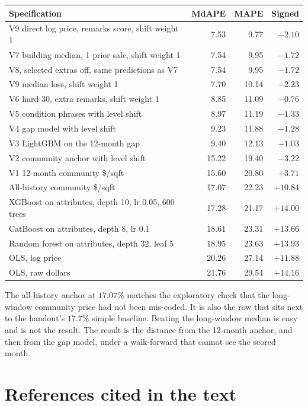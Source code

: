 \documentclass[11pt]{article}
\begin{document}
\begin{center}
\small
\begin{tabular}{p{9.2cm}rrr}
\toprule
Specification & MdAPE & MAPE & Signed \\
\midrule
V9 direct log price, remarks score, shift weight 1 & 7.53 & 9.77 & \(-2.10\) \\
V7 building median, 1 prior sale, shift weight 1 & 7.54 & 9.95 & \(-1.72\) \\
V8, selected extras off, same predictions as V7 & 7.54 & 9.95 & \(-1.72\) \\
V9 median loss, shift weight 1 & 7.70 & 10.14 & \(-2.23\) \\
V6 hard 30, extra remarks, shift weight 1 & 8.85 & 11.09 & \(-0.76\) \\
V5 condition phrases with level shift & 8.97 & 11.19 & \(-1.33\) \\
V4 gap model with level shift & 9.23 & 11.88 & \(-1.28\) \\
V3 LightGBM on the 12-month gap & 9.40 & 12.13 & \(+1.03\) \\
V2 community anchor with level shift & 15.22 & 19.40 & \(-3.22\) \\
V1 12-month community \$/sqft & 15.60 & 20.80 & \(+3.71\) \\
All-history community \$/sqft & 17.07 & 22.23 & \(+10.84\) \\
XGBoost on attributes, depth 10, lr 0.05, 600 trees & 17.28 & 21.17 & \(+14.00\) \\
CatBoost on attributes, depth 8, lr 0.1 & 18.61 & 23.31 & \(+13.66\) \\
Random forest on attributes, depth 32, leaf 5 & 18.95 & 23.63 & \(+13.93\) \\
OLS, log price & 20.26 & 27.14 & \(+11.88\) \\
OLS, raw dollars & 21.76 & 29.54 & \(+14.16\) \\
\bottomrule
\end{tabular}
\end{center}

\noindent The all-history anchor at \(17.07\%\) matches the exploratory check that the long-window community price had not been mis-coded. It is also the row that sits next to the handout's \(17.7\%\) simple baseline. Beating the long-window median is easy and is not the result. The result is the distance from the 12-month anchor, and then from the gap model, under a walk-forward that cannot see the scored month.

\section{References cited in the text}
\end{document}
